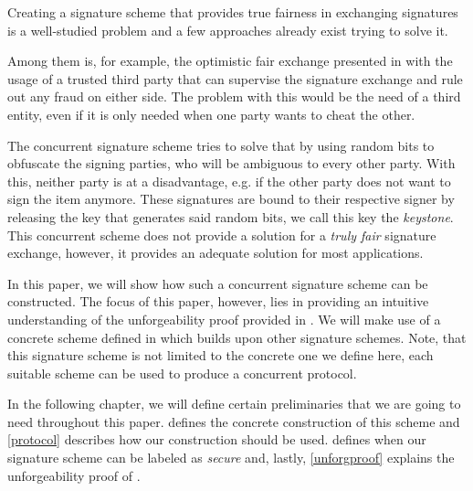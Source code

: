 Creating a signature scheme that provides true fairness in exchanging signatures is a well-studied problem and a few approaches already exist trying to solve it.

Among them is, for example, the optimistic fair exchange presented in \cite{asokan1998optimistic} with the usage of a trusted third party that can supervise the signature exchange and rule out any fraud on either side. 
The problem with this would be the need of a third entity, even if it is only needed when one party wants to cheat the other. 

The concurrent signature scheme \cite{chen2004concurrent} tries to solve that by using random bits to obfuscate the signing parties, who will be ambiguous to every other party.
With this, neither party is at a disadvantage, e.g. if the other party does not want to sign the item anymore.
These signatures are bound to their respective signer by releasing the key that generates said random bits, we call this key the \textit{keystone}.
This concurrent scheme does not provide a solution for a \textit{truly fair} signature exchange, however, it provides an adequate solution for most applications.

In this paper, we will show how such a concurrent signature scheme can be constructed.
The focus of this paper, however, lies in providing an intuitive understanding of the unforgeability proof provided in \cite{chen2004concurrent}.
We will make use of a concrete scheme defined in \cite{chen2004concurrent} which builds upon other signature schemes.
Note, that this signature scheme is not limited to the concrete one we define here, each suitable scheme can be used to produce a concurrent protocol.

In the following chapter, we will define certain preliminaries that we are going to need throughout this paper.
 defines the concrete construction of this scheme and \cref{protocol} describes how our construction should be used.
 defines when our signature scheme can be labeled as \textit{secure} and, lastly, \cref{unforgproof} explains the unforgeability proof of \cite{chen2004concurrent}.